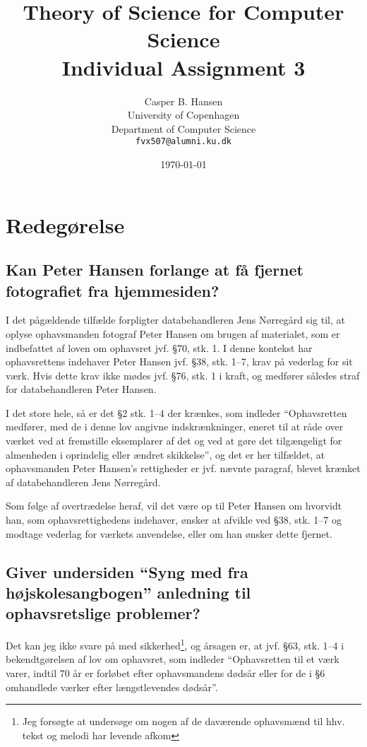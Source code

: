\documentclass[a4paper]{article}
\title
{
	{\large Theory of Science for Computer Science}\\
	Individual Assignment 3
}
\author
{
	Casper B. Hansen\\
	University of Copenhagen\\
	Department of Computer Science\\
	{\tt fvx507@alumni.ku.dk}
}
\date{\today}
\begin{document}
\clearpage
\maketitle
\thispagestyle{empty}

\newpage
\section{Redegørelse}

\subsection{Kan Peter Hansen forlange at få fjernet fotografiet fra
hjemmesiden?}
I det pågældende tilfælde forpligter databehandleren Jens Nørregård sig til,
at oplyse ophavsmanden fotograf Peter Hansen om brugen af materialet, som er
indbefattet af loven om ophavsret\cite{ophav} jvf. §70, stk. 1. I denne
kontekst har ophavsrettens indehaver Peter Hansen jvf. §38, stk. 1--7, krav på
vederlag for sit værk. Hvis dette krav ikke mødes jvf. §76, stk. 1 i kraft, og
medfører således straf for databehandleren Peter Hansen.

I det store hele, så er det §2 stk. 1--4 der krænkes, som indleder\cite{ophav}
``Ophavsretten medfører, med de i denne lov angivne indskrænkninger, eneret
til at råde over værket ved at fremstille eksemplarer af det og ved at gøre
det tilgængeligt for almenheden i oprindelig eller ændret skikkelse'', og det
er her tilfældet, at ophavsmanden Peter Hansen's rettigheder er jvf. nævnte
paragraf, blevet krænket af databehandleren Jens Nørregård.

Som følge af overtrædelse heraf, vil det være op til Peter Hansen om hvorvidt
han, som ophavsrettighedens indehaver, ønsker at afvikle ved §38, stk. 1--7 og
modtage vederlag for værkets anvendelse, eller om han ønsker dette fjernet.

\subsection{Giver undersiden ``Syng med fra højskolesangbogen'' anledning til
ophavsretslige problemer?}
Det kan jeg ikke svare på med sikkerhed\footnote{Jeg forsøgte at undersøge
om nogen af de daværende ophavsmænd til hhv. tekst og melodi har levende
afkom}, og årsagen er, at jvf. §63, stk. 1--4 i bekendtgørelsen af lov om
ophavsret\cite{ophav}, som indleder ``Ophavsretten til et værk varer, indtil
70 år er forløbet efter ophavsmandens dødsår eller for de i §6 omhandlede
værker efter længstlevendes dødsår''.
\end{document}
